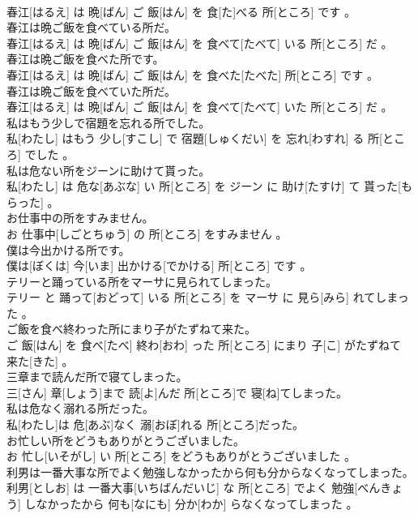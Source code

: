 \documentclass[8pt]{extreport}
\begin{document}
\begin{CJK}{UTF8}{min}
\\	春江[はるえ] は 晩[ばん] ご 飯[はん] を 食[た]べる 所[ところ] です 。
\\	春江は晩ご飯を食べている所だ。	
\\	春江[はるえ] は 晩[ばん] ご 飯[はん] を 食べて[たべて] いる 所[ところ] だ 。
\\	春江は晩ご飯を食べた所です。	
\\	春江[はるえ] は 晩[ばん] ご 飯[はん] を 食べた[たべた] 所[ところ] です 。
\\	春江は晩ご飯を食べていた所だ。	
\\	春江[はるえ] は 晩[ばん] ご 飯[はん] を 食べて[たべて] いた 所[ところ] だ 。
\\	私はもう少しで宿題を忘れる所でした。	
\\	私[わたし] はもう 少し[すこし] で 宿題[しゅくだい] を 忘れ[わすれ] る 所[ところ] でした 。
\\	私は危ない所をジーンに助けて貰った。	
\\	私[わたし] は 危な[あぶな] い 所[ところ] を ジーン に 助け[たすけ] て 貰った[もらった] 。
\\	お仕事中の所をすみません。	
\\	お 仕事中[しごとちゅう] の 所[ところ] をすみません 。
\\	僕は今出かける所です。	
\\	僕は[ぼくは] 今[いま] 出かける[でかける] 所[ところ] です 。
\\	テリーと踊っている所をマーサに見られてしまった。	
\\	テリー と 踊って[おどって] いる 所[ところ] を マーサ に 見ら[みら] れてしまった 。
\\	ご飯を食べ終わった所にまり子がたずねて来た。	
\\	ご 飯[はん] を 食べ[たべ] 終わ[おわ] った 所[ところ] にまり 子[こ] がたずねて 来た[きた] 。
\\	三章まで読んだ所で寝てしまった。	
\\	三[さん] 章[しょう]まで 読[よ]んだ 所[ところ]で 寝[ね]てしまった。
\\	私は危なく溺れる所だった。	
\\	私[わたし]は 危[あぶ]なく 溺[おぼ]れる 所[ところ]だった。
\\	お忙しい所をどうもありがとうございました。	
\\	お 忙し[いそがし] い 所[ところ] をどうもありがとうございました 。
\\	利男は一番大事な所でよく勉強しなかったから何も分からなくなってしまった。	
\\	利男[としお] は 一番大事[いちばんだいじ] な 所[ところ] でよく 勉強[べんきょう] しなかったから 何も[なにも] 分か[わか] らなくなってしまった 。

\end{CJK}
\end{document}
